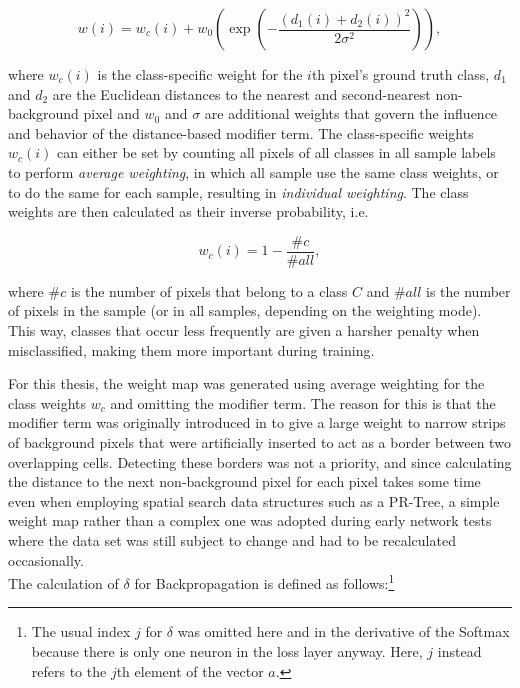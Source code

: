 \[ w(i) = w_c(i) + w_0 \left ( \exp \left (- \frac{(d_1(i) + d_2(i))^2}{2\sigma^2} \right ) \right ), \]

\noindent where $w_c(i)$ is the class-specific weight for the $i$th pixel's ground truth class, $d_1$ and $d_2$ are the Euclidean distances to the nearest and second-nearest non-background pixel and $w_0$ and $\sigma$ are additional weights that govern the influence and behavior of the distance-based modifier term. The class-specific weights $w_c(i)$ can either be set by counting all pixels of all classes in all sample labels to perform \textit{average weighting}, in which all sample use the same class weights, or to do the same for each sample, resulting in \textit{individual weighting}. The class weights are then calculated as their inverse probability, i.e.

\[ w_c(i) = 1 - \frac{\#c}{\#all}, \]

\noindent where $\#c$ is the number of pixels that belong to a class $C$ and $\#all$ is the number of pixels in the sample (or in all samples, depending on the weighting mode). This way, classes that occur less frequently are given a harsher penalty when misclassified, making them more important during training.

For this thesis, the weight map was generated using average weighting for the class weights $w_c$ and omitting the modifier term. The reason for this is that the modifier term was originally introduced in \cite{unet} to give a large weight to narrow strips of background pixels that were artificially inserted to act as a border between two overlapping cells. Detecting these borders was not a priority, and since calculating the distance to the next non-background pixel for each pixel takes some time even when employing spatial search data structures such as a PR-Tree,  a simple weight map rather than a complex one was adopted during early network tests where the data set was still subject to change and had to be recalculated occasionally.\\

\noindent The calculation of $\delta$ for Backpropagation is defined as follows:\footnote{The usual index $j$ for $\delta$ was omitted here and in the derivative of the Softmax because there is only one neuron in the loss layer anyway. Here, $j$ instead refers to the $j$th element of the vector $a$.} \\



